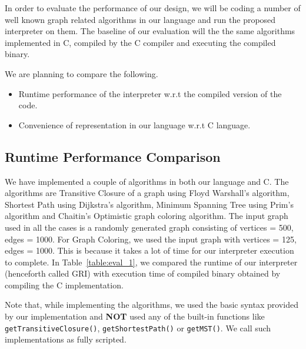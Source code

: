 In order to evaluate the performance of our design, we will be coding a number 
of well known graph related algorithms in our language and run the proposed interpreter on 
them. The baseline of our evaluation will the the same algorithms implemented in 
C,  compiled by the C compiler and executing the compiled binary.

We are planning to compare the following.
\begin{itemize}
  \item Runtime performance of the interpreter 
w.r.t the compiled version of the code.
  \item Convenience of representation in our 
language w.r.t C language.
\end{itemize}


\subsection{Runtime Performance Comparison}

We have implemented a couple of algorithms in both our language and C. The 
algorithms are Transitive Closure of a graph using Floyd Warshall's algorithm, 
           Shortest Path using Dijkstra's algorithm, Minimum Spanning Tree using 
           Prim's algorithm and Chaitin's Optimistic graph coloring algorithm.
The input graph used in all the cases is a randomly generated graph consisting  of vertices = 500, edges = 1000. 
For Graph Coloring, we used the input graph with vertices = 125, edges = 1000. This is 
because it takes a lot of time for our interpreter execution to complete.
In Table~\ref{table:eval_1}, we compared the runtime of our interpreter 
(henceforth called GRI) with 
execution time of compiled binary obtained by compiling the C implementation.

Note that, while implementing the algorithms, we used the basic syntax provided 
by our implementation and \textbf{NOT} used any of the  built-in 
functions like {\tt getTransitiveClosure()}, {\tt getShortestPath()} or {\tt getMST()}. 
We call such implementations as fully scripted.

